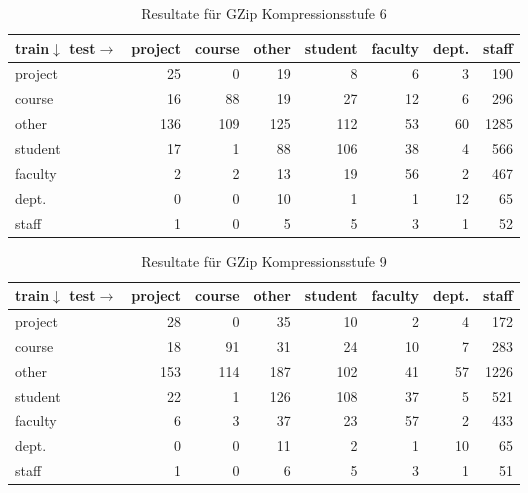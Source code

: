 \begin{frame}[c]
\begin{itemize}
  \begin{table}[htbp]
\caption{Resultate für GZip Kompressionsstufe 6}
\begin{tabular}{|l|r|r|r|r|r|r|r|}
\hline
train$\downarrow$ test$\rightarrow$& \multicolumn{1}{l|}{project} & \multicolumn{1}{l|}{course} &
\multicolumn{1}{l|}{other} & \multicolumn{1}{l|}{student} &
\multicolumn{1}{l|}{faculty} & \multicolumn{1}{l|}{dept.} &
\multicolumn{1}{l|}{staff} \\ \hline project & 25 & 0 & 19 & 8 & 6 & 3 & 190 \\ \hline course & 16 & 88 & 19 & 27 & 12 & 6 & 296 \\ \hline other & 136 & 109 & 125 & 112 & 53 & 60 & 1285 \\ \hline
student & 17 & 1 & 88 & 106 & 38 & 4 & 566 \\ \hline
faculty & 2 & 2 & 13 & 19 & 56 & 2 & 467 \\ \hline
dept. & 0 & 0 & 10 & 1 & 1 & 12 & 65 \\ \hline
staff & 1 & 0 & 5 & 5 & 3 & 1 & 52 \\ \hline
\end{tabular}
\label{tbl:GzipL6}
\end{table}
  
  
   
\end{itemize}
\end{frame}

\begin{frame}[c]
\begin{itemize}
  \begin{table}[htbp]
\caption{Resultate für GZip Kompressionsstufe 9}
\begin{tabular}{|l|r|r|r|r|r|r|r|}
\hline
train$\downarrow$ test$\rightarrow$& \multicolumn{1}{l|}{project} & \multicolumn{1}{l|}{course} &
\multicolumn{1}{l|}{other} & \multicolumn{1}{l|}{student} &
\multicolumn{1}{l|}{faculty} & \multicolumn{1}{l|}{dept.} &
\multicolumn{1}{l|}{staff} \\ \hline project & 28 & 0 & 35 & 10 & 2 & 4 & 172 \\ \hline course & 18 & 91 & 31 & 24 & 10 & 7 & 283 \\ \hline other & 153 & 114 & 187 & 102 & 41 & 57 & 1226 \\ \hline
student & 22 & 1 & 126 & 108 & 37 & 5 & 521 \\ \hline
faculty & 6 & 3 & 37 & 23 & 57 & 2 & 433 \\ \hline
dept. & 0 & 0 & 11 & 2 & 1 & 10 & 65 \\ \hline
staff & 1 & 0 & 6 & 5 & 3 & 1 & 51 \\ \hline
\end{tabular}
\label{tbl:GzipL9}
\end{table}
   
\end{itemize}
\end{frame}

